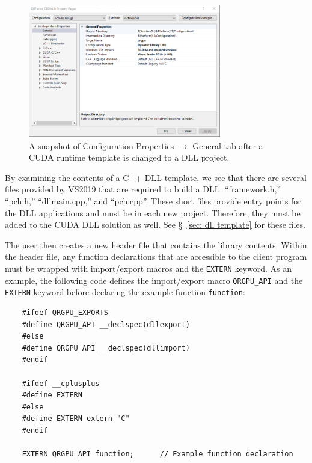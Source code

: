 \documentclass[11pt,letterpaper]{article}
\begin{document}
\begin{figure}[h]
    \centering
    \includegraphics[width=0.75\textwidth]{DLL_GeneralProperties.png}
    \caption{A snapshot of Configuration Properties $\to$ General tab after a CUDA runtime template is changed to a DLL project.}
    \label{fig: gen props}
\end{figure}

By examining the contents of a \href{https://docs.microsoft.com/en-us/cpp/build/walkthrough-creating-and-using-a-dynamic-link-library-cpp?view=msvc-160}{C++ DLL template}, we see that there are several files provided by VS2019 that are required to build a DLL: ``framework.h,'' ``pch.h,'' ``dllmain.cpp,'' and ``pch.cpp''. These short files provide entry points for the DLL applications and must be in each new project. Therefore, they must be added to the CUDA DLL solution as well. See \S\!~\ref{sec: dll template} for these files.

The user then creates a new header file that contains the library contents. Within the header file, any function declarations that are accessible to the client program must be wrapped with import/export macros and the \verb+EXTERN+ keyword. As an example, the following code defines the import/export macro \verb+QRGPU_API+ and the \verb+EXTERN+ keyword before declaring the example function \verb+function+:

\newpage 

\begin{verbatim}
    #ifdef QRGPU_EXPORTS
    #define QRGPU_API __declspec(dllexport)
    #else
    #define QRGPU_API __declspec(dllimport)
    #endif

    #ifdef __cplusplus			
    #define EXTERN
    #else
    #define EXTERN extern "C"
    #endif

    EXTERN QRGPU_API function;      // Example function declaration
\end{verbatim}
\end{document}
